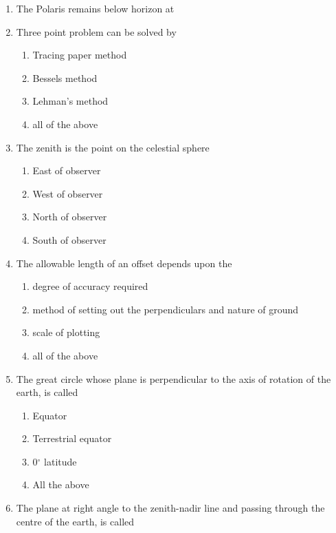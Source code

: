 \documentclass[11pt,a4paper]{article}
\begin{document}
\begin{enumerate}
\item{The Polaris remains below horizon at}
\\
\item{Three point problem can be solved by}
\begin{enumerate}[label=\Alph*.]
\item{Tracing paper method}
\item{Bessels method}
\item{Lehman's method}
\item{all of the above}
\end{enumerate}
\item{The zenith is the point on the celestial sphere}
\begin{enumerate}[label=\Alph*.]
\item{East of observer}
\item{West of observer}
\item{North of observer}
\item{South of observer}
\end{enumerate}
\item{The allowable length of an offset depends upon the}
\begin{enumerate}[label=\Alph*.]
\item{degree of accuracy required}
\item{method of setting out the perpendiculars and nature of ground}
\item{scale of plotting}
\item{all of the above}
\end{enumerate}
\item{The great circle whose plane is perpendicular to the axis of rotation of the earth, is called}
\begin{enumerate}[label=\Alph*.]
\item{Equator}
\item{Terrestrial equator}
\item{0$^\circ$ latitude}
\item{All the above}
\end{enumerate}
\item{The plane at right angle to the zenith-nadir line and passing through the centre of the earth, is called}

\end{enumerate}
\end{document}
